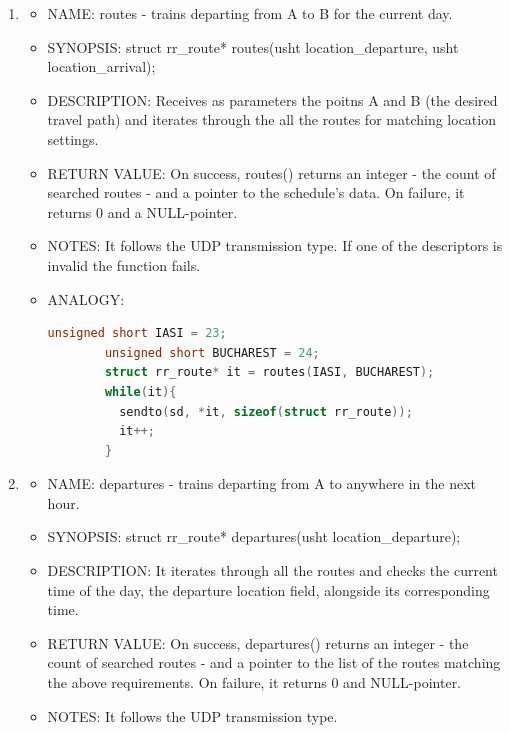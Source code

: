 \documentclass[runningheads]{llncs}
\begin{document}
\begin{enumerate}
  \item \begin{itemize} 
    \item NAME: routes - trains departing from A to B for the current day.
    \item SYNOPSIS: struct rr\_route* routes(usht location\_departure, usht location\_arrival);
    \item DESCRIPTION: Receives as parameters the poitns A and B (the desired travel path) and iterates through the all the routes for matching location settings.
    \item RETURN VALUE: On success, routes() returns an integer - the count of searched routes - and a pointer to the schedule's data. On failure, it returns 0 and a NULL-pointer.
    \item NOTES: It follows the UDP transmission type. If one of the descriptors is invalid the function fails.
    \item ANALOGY:
      \begin{lstlisting}[language=C++]
        unsigned short IASI = 23;
        unsigned short BUCHAREST = 24;
        struct rr_route* it = routes(IASI, BUCHAREST);
        while(it){
          sendto(sd, *it, sizeof(struct rr_route));
          it++; 
        }
      \end{lstlisting}
    \vspace{0.3cm}
  \end{itemize}
   
  \item \begin{itemize}
    \item NAME: departures - trains departing from A to anywhere in the next hour.
    \item SYNOPSIS: struct rr\_route* departures(usht location\_departure);
    \item DESCRIPTION: It iterates through all the routes and checks the current time of the day, the departure location field, alongside its corresponding time. 
    \item RETURN VALUE: On success, departures() returns an integer - the count of searched routes - and a pointer to the list of the routes matching the above requirements. On failure, it returns 0 and NULL-pointer.
    \item NOTES: It follows the UDP transmission type.
    \vspace{0.3cm}
  \end{itemize}
   

\end{enumerate}
\end{document}
